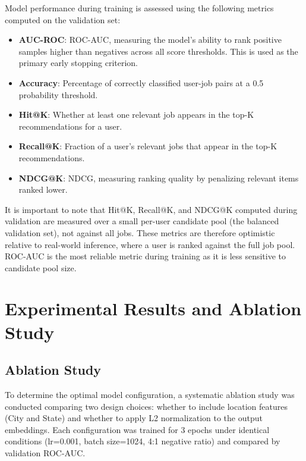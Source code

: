 Model performance during training is assessed using the following metrics computed on the validation set:
\begin{itemize}
    \item \textbf{AUC-ROC}: \gls{ROC-AUC}, measuring the model's ability to rank positive samples higher than negatives across all score thresholds. This is used as the primary early stopping criterion.
    \item \textbf{Accuracy}: Percentage of correctly classified user-job pairs at a 0.5 probability threshold.
    \item \textbf{Hit@K}: Whether at least one relevant job appears in the top-K recommendations for a user.
    \item \textbf{Recall@K}: Fraction of a user's relevant jobs that appear in the top-K recommendations.
    \item \textbf{NDCG@K}: \gls{NDCG}, measuring ranking quality by penalizing relevant items ranked lower.
\end{itemize}

It is important to note that Hit@K, Recall@K, and NDCG@K computed during validation are measured over a small per-user candidate pool (the balanced validation set), not against all jobs. These metrics are therefore optimistic relative to real-world inference, where a user is ranked against the full job pool. \gls{ROC-AUC} is the most reliable metric during training as it is less sensitive to candidate pool size.

\section{Experimental Results and Ablation Study}
\label{sec:user_experiments}

\subsection{Ablation Study}
\label{sec:ablation}

To determine the optimal model configuration, a systematic ablation study was conducted comparing two design choices: whether to include location features (City and State) and whether to apply L2 normalization to the output embeddings. Each configuration was trained for 3 epochs under identical conditions (lr=0.001, batch size=1024, 4:1 negative ratio) and compared by validation \gls{ROC-AUC}.

